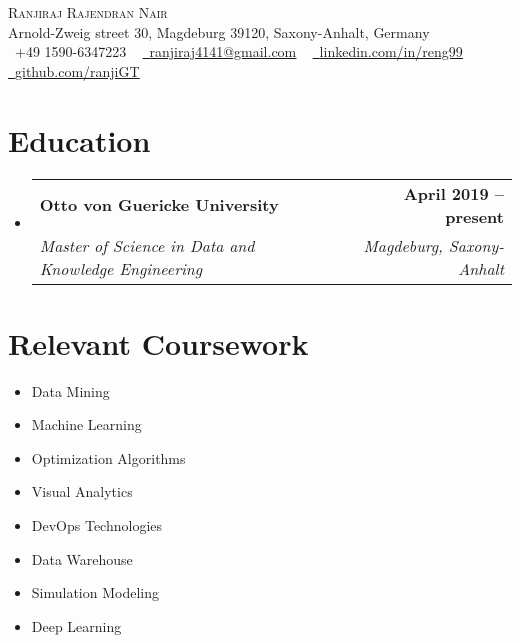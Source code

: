 \documentclass[letterpaper,11pt]{article}
\makeatletter
\newcommand{\resumeSubheading}[4]{
  \vspace{-2pt}\item
    \begin{tabular*}{1.0\textwidth}[t]{l@{\extracolsep{\fill}}r}
      \textbf{#1} & \textbf{\small #2} \\
      \textit{\small#3} & \textit{\small #4} \\
    \end{tabular*}\vspace{-7pt}
}
\newcommand{\resumeSubHeadingListStart}{\begin{itemize}[leftmargin=0.0in, label={}]}
\newcommand{\resumeSubHeadingListEnd}{\end{itemize}}
\makeatother
\begin{document}

\begin{center}
    {\Huge \scshape Ranjiraj Rajendran Nair} \\ \vspace{1pt}
    Arnold-Zweig street 30, Magdeburg 39120, Saxony-Anhalt, Germany\\ \vspace{1pt}
    \small \raisebox{-0.1\height}\faPhone\ +49 1590-6347223 ~ \href{mailto:ranjiraj4141@gmail.com}{\raisebox{-0.2\height}\faEnvelope\  \underline{ranjiraj4141@gmail.com}} ~ 
    \href{https://linkedin.com/in/reng99/}{\raisebox{-0.2\height}\faLinkedin\ \underline{linkedin.com/in/reng99}}  ~
    \href{https://github.com/ranjiGT/}{\raisebox{-0.2\height}\faGithub\ \underline{github.com/ranjiGT}}
    \vspace{-8pt}
\end{center}


\section{Education}
  \resumeSubHeadingListStart
    \resumeSubheading
      {Otto von Guericke University}{April 2019 -- present}
      {Master of Science in Data and Knowledge Engineering}{Magdeburg, Saxony-Anhalt}
  \resumeSubHeadingListEnd

\section{Relevant Coursework}
        \begin{multicols}{4}
            \begin{itemize}[itemsep=-5pt, parsep=3pt]
                \item\small Data Mining
                \item Machine Learning
                \item Optimization Algorithms 
                \item Visual Analytics
                \item DevOps Technologies
                \item Data Warehouse
                \item Simulation Modeling
                \item Deep Learning 
            \end{itemize}
        \end{multicols}
        \vspace*{2.0\multicolsep}
\end{document}
